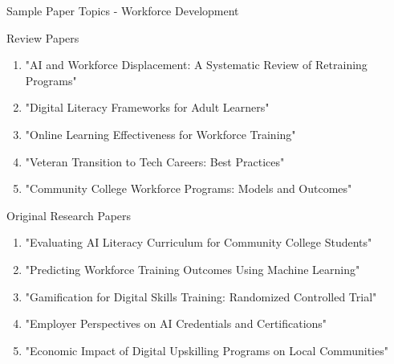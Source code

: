 \documentclass[11pt]{beamer}
\begin{document}
	\begin{frame}{Sample Paper Topics - Workforce Development}
		\scriptsize
		\begin{block}{Review Papers}
			\begin{enumerate}
				\item "AI and Workforce Displacement: A Systematic Review of Retraining Programs"
				\item "Digital Literacy Frameworks for Adult Learners"
				\item "Online Learning Effectiveness for Workforce Training"
				\item "Veteran Transition to Tech Careers: Best Practices"
				\item "Community College Workforce Programs: Models and Outcomes"
			\end{enumerate}
		\end{block}
		\begin{block}{Original Research Papers}
			\begin{enumerate}
				\item "Evaluating AI Literacy Curriculum for Community College Students"
				\item "Predicting Workforce Training Outcomes Using Machine Learning"
				\item "Gamification for Digital Skills Training: Randomized Controlled Trial"
				\item "Employer Perspectives on AI Credentials and Certifications"
				\item "Economic Impact of Digital Upskilling Programs on Local Communities"
			\end{enumerate}
		\end{block}
	\end{frame}
	
\end{document}
